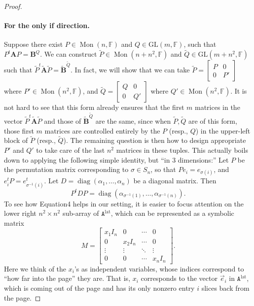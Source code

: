 \begin{proof}
\paragraph{For the only if direction.}
Suppose there exist $P\in\operatorname{Mon}(n,\mathbb F)$ and $Q\in\mathrm{GL}(m,\mathbb F)$, such that $P^t\mathbf A P=\mathbf B^Q$. We can construct $\widetilde P\in\operatorname{Mon}(n+n^2,\mathbb F)$ and $\widetilde Q\in\mathrm{GL}(m+n^2,\mathbb F)$ such that $\widetilde P^t\widetilde{\mathbf A}\widetilde P=\widetilde{\mathbf B}^{\widetilde Q}$. In fact, we will show that we can take $\widetilde P=\begin{bmatrix}P&0\\0&P'\end{bmatrix}$ where $P'\in\operatorname{Mon}(n^2,\mathbb F)$, and $\widetilde Q=\begin{bmatrix}Q&0\\0&Q'\end{bmatrix}$ where $Q'\in\operatorname{Mon}(n^2,\mathbb F)$. It is not hard to see that this form already ensures that the first $m$ matrices in the vector $\widetilde P^t\widetilde{\mathbf A}\widetilde P$ and those of $\widetilde{\mathbf B}^{\widetilde Q}$ are the same, since when $\widetilde P,\widetilde Q$ are of this form, those first $m$ matrices are controlled entirely by the $P$ (resp., $Q$) in the upper-left block of $\widetilde P$ (resp., $\widetilde Q$).
The remaining question is then how to design appropriate $P'$ and $Q'$ to take care of the last $n^2$ matrices in these tuples. This actually boils down to applying the following simple identity, but ``in 3 dimensions:'' Let $P$ be the permutation matrix corresponding to $\sigma\in S_n$, so that $Pe_i=e_{\sigma(i)}$, and $e_i^tP=e_{\sigma^{-1}(i)}^t$. Let $D=\operatorname{diag}(\alpha_1,\ldots,\alpha_n)$ be a diagonal matrix. Then
\begin{equation}\tag{4}P^tDP=\operatorname{diag}(\alpha_{\sigma^{-1}(1)},\ldots,\alpha_{\sigma^{-1}(n)}).\end{equation}
To see how Equation4 helps in our setting, it is easier to focus attention on the lower right $n^2\times n^2$ sub-array of $\mathtt A^{\mathrm{lat}}$, which can be represented as a symbolic matrix
\[M=\begin{bmatrix}x_1I_n&0&\cdots&0\\0&x_2I_n&\cdots&0\\\vdots&\vdots&\ddots&\vdots\\0&0&\cdots&x_nI_n\end{bmatrix}.\]
Here we think of the $x_i$'s as independent variables, whose indices correspond to ``how far into the page'' they are. That is, $x_i$ corresponds to the vector $\vec e_i$ in $\mathtt A^{\mathrm{lat}}$, which is coming out of the page and has its only nonzero entry $i$ slices back from the page.

\end{proof}
